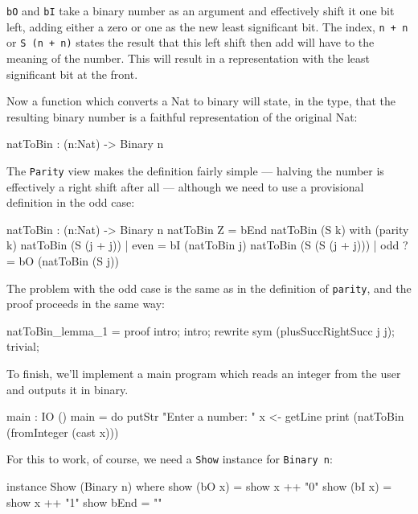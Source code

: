 \noindent
\texttt{bO} and \texttt{bI} take a binary number as an argument and effectively shift it one bit
left, adding either a zero or one as the new least significant bit. The index,
\texttt{n + n} or \texttt{S (n + n)} states the result that this left shift then add will
have to the meaning of the number. This will result in a representation with
the least significant bit at the front.

Now a function which converts a Nat to binary will state, in the type, that the
resulting binary number is a faithful representation of the original Nat:

\begin{code}
natToBin : (n:Nat) -> Binary n
\end{code}

\noindent
The \texttt{Parity} view makes the definition fairly simple --- halving the
number is effectively a right shift after all --- although we need to use a
provisional definition in the odd case:

\begin{code}
natToBin : (n:Nat) -> Binary n
natToBin Z = bEnd
natToBin (S k) with (parity k)
   natToBin (S (j + j))     | even  = bI (natToBin j)
   natToBin (S (S (j + j))) | odd  ?= bO (natToBin (S j))
\end{code}

\noindent
The problem with the odd case is the same as in the definition of \texttt{parity}, and
the proof proceeds in the same way:

\begin{code}
natToBin_lemma_1 = proof {
    intro;
    intro;
    rewrite sym (plusSuccRightSucc j j);
    trivial;
}
\end{code}

\noindent
To finish, we'll implement a main program which reads an integer from the user and
outputs it in binary. 

\begin{code}
main : IO ()
main = do putStr "Enter a number: "
          x <- getLine
          print (natToBin (fromInteger (cast x)))
\end{code}

\noindent
For this to work, of course, we need a \texttt{Show} instance for \texttt{Binary n}:

\begin{code}
instance Show (Binary n) where
    show (bO x) = show x ++ "0"
    show (bI x) = show x ++ "1"
    show bEnd = ""
\end{code}

